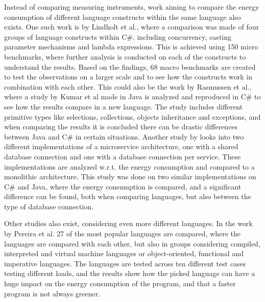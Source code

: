 Instead of comparing measuring instruments, work aiming to compare the energy consumption of different language constructs within the same language also exists. One such work is by Lindholt et al.\cite[]{Lindholt2022}, where a comparison was made of four groups of language constructs within C\#, including concurrency, casting parameter mechanisms and lambda expressions. This is achieved using 150 micro benchmarks, where further analysis is conducted on each of the constructs to understand the results. Based on the findings, 68 macro benchmarks are created to test the observations on a larger scale and to see how the constructs work in combination with each other. This could also be the work by Rasmussen et al.\cite[]{Rasmussen2021}, where a study by Kumar et al\cite[]{Kumar2017} made in Java is analyzed and reproduced in C\# to see how the results compare in a new language. The study includes different primitive types like selections, collections, objects inheritance and exceptions, and when comparing the results it is concluded there can be drastic differences between Java and C\# in certain situations. Another study by \cite[]{Theilmann2022} looks into two different implementations of a microservice architecture, one with a shared database connection and one with a database connection per service. These implementations are analyzed w.r.t. the energy consumption and compared to a monolithic architecture. This study was done on two similar implementations on C\# and Java, where the energy consumption is compared, and a significant difference can be found, both when comparing languages, but also between the type of database connection.

Other studies also exist, considering even more different languages. In the work by Pereira et al.\cite[]{Pereira2017} 27 of the most popular languages are compared, where the languages are compared with each other, but also in groups considering compiled, interpreted and virtual machine languages or object-oriented, functional and imperative languages. The languages are tested across ten different test cases testing different loads, and the results show how the picked language can have a huge impact on the energy consumption of the program, and that a faster program is not always greener.

